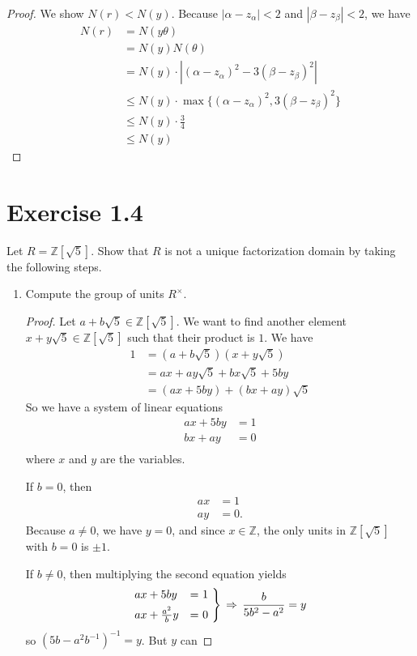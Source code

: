\documentclass[a4paper]{article}
\begin{document}
\begin{proof}
  We show \(N(r) < N(y)\). Because \(|\alpha - z_\alpha| < 2\) and \(|\beta - z_\beta| < 2\), we have
  \begin{align*}
    N(r) &= N(y \theta) \\
    &= N(y) N(\theta) \\
    &= N(y) \cdot |(\alpha - z_\alpha)^2 - 3 (\beta - z_\beta)^2| \\
    &\leq N(y) \cdot \max\{(\alpha - z_\alpha)^2, 3 (\beta - z_\beta)^2\} \\
    &\leq N(y) \cdot \frac{3}{4} \\
    &\leq N(y)
  \end{align*}
\end{proof}
\newpage
\section*{Exercise 1.4}
Let \(R = \mathbb{Z}[\sqrt{5}]\). Show that \(R\) is not a unique factorization domain by taking the following steps.
\begin{enumerate}
  \item Compute the group of units \(R^\times\).
  \begin{proof}
    Let \(a + b \sqrt{5} \in \mathbb{Z}[\sqrt{5}]\). We want to find another element \(x + y \sqrt{5} \in \mathbb{Z}[\sqrt{5}]\) such that their product is \(1\). We have
    \begin{align*}
      1 &= (a + b \sqrt{5}) (x + y \sqrt{5}) \\
      &= ax + ay\sqrt{5} + bx \sqrt{5} + 5 by \\
      &= (ax + 5by) + (bx + ay) \sqrt{5}
    \end{align*}
    So we have a system of linear equations
    \begin{align*}
      ax + 5 by &= 1 \\
      bx + ay &= 0 \\
    \end{align*}
    where \(x\) and \(y\) are the variables.

    If \(b = 0\), then
    \begin{align*}
      ax &= 1 \\
      ay &= 0 \text{.}
    \end{align*}
    Because \(a \neq 0\), we have \(y = 0\), and since \(x \in \mathbb{Z}\), the only units in \(\mathbb{Z}[\sqrt{5}]\) with \(b = 0\) is \(\pm 1\).

    If \(b \neq 0\), then multiplying the second equation yields
    \begin{align*}
      \begin{rcases*}
        ax + 5by &= 1 \\
        ax + \frac{a^2}{b}y &= 0
      \end{rcases*}
      \, \Rightarrow \, \frac{b}{5b^2 - a^2} = y
    \end{align*}
    so \((5b - a^2 b^{-1})^{-1} = y\). But \(y\) can 
  \end{proof}
\end{enumerate}
\end{document}
